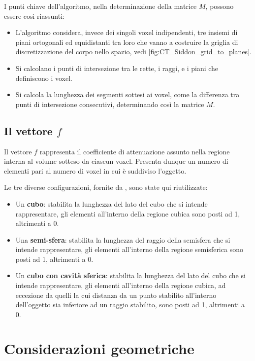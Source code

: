 \documentclass[12pt,a4paper]{report}
\begin{document}
I punti chiave dell'algoritmo, nella determinazione della matrice \(M\), possono essere così riassunti:
\begin{itemize}
  \item L'algoritmo considera, invece dei singoli voxel indipendenti, tre insiemi di piani ortogonali ed equidistanti tra loro che
        vanno a costruire la griglia di discretizzazione del corpo nello spazio, vedi \autoref{fig:CT_Siddon_grid_to_planes}.
  \item Si calcolano i punti di intersezione tra le rette, i raggi, e i piani che definiscono i voxel.
  \item Si calcola la lunghezza dei segmenti sottesi ai voxel, come la differenza tra punti di intersezione consecutivi,
        determinando così la matrice \(M\).
\end{itemize}

\subsection{Il vettore \(f\)}

Il vettore \(f\) rappresenta il coefficiente di attenuazione assunto nella regione interna al volume sotteso da ciascun voxel.
Presenta dunque un numero di elementi pari al numero di voxel in cui è suddiviso l'oggetto.

Le tre diverse configurazioni, fornite da \cite{Colletta2024}, sono state qui riutilizzate:
\begin{itemize}
  \item Un \textbf{cubo}: stabilita la lunghezza del lato del cubo che si intende rappresentare, gli elementi all'interno della
        regione cubica sono posti ad 1, altrimenti a 0.
  \item Una \textbf{semi-sfera}: stabilita la lunghezza del raggio della semisfera che si intende rappresentare, gli elementi
        all'interno della regione semisferica sono posti ad 1, altrimenti a 0.
  \item Un \textbf{cubo con cavità sferica}: stabilita la lunghezza del lato del cubo che si intende rappresentare, gli elementi
        all'interno della regione cubica, ad eccezione da quelli la cui distanza da un punto stabilito all'interno dell'oggetto
        sia inferiore ad un raggio stabilito, sono posti ad 1, altrimenti a 0.
\end{itemize}

\section{Considerazioni geometriche}
\end{document}
